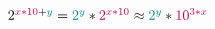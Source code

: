 \documentclass[aspectratio=43]{beamer}
\begin{document}
\begin{frame}[fragile]

  $2^{\textcolor{purple}{x*10} + \textcolor{teal}{y}} =  \textcolor{teal}{2^y} * \textcolor{purple}{2^{x*10}} \approx \textcolor{teal}{2^y} * \textcolor{purple}{10^{3*x}}$
  \vspace{20pt}

\end{frame}
\end{document}
